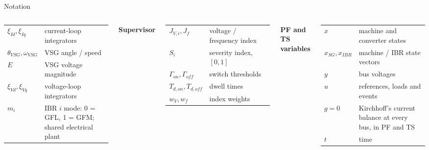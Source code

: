 \documentclass{beamer}
\begin{document}
\begin{frame}{Notation}
\begin{columns}[t,onlytextwidth]
\begin{tabular}{@{}p{1.65cm}>{\raggedright\arraybackslash}p{3.25cm}@{}}
$\xi_{Id},\xi_{Iq}$ & current-loop integrators\\
$\theta_{VSG},\omega_{VSG}$ & VSG angle / speed\\
$E$ & VSG voltage magnitude\\
$\xi_{Vd},\xi_{Vq}$ & voltage-loop integrators\\
$m_i$ & IBR $i$ mode: 0 = GFL, 1 = GFM; shared electrical plant\\
\end{tabular}\par\medskip
\textbf{Supervisor}\par\smallskip
\begin{tabular}{@{}p{1.65cm}>{\raggedright\arraybackslash}p{3.25cm}@{}}
$J_{V,i},J_f$ & voltage / frequency index\\
$S_i$ & severity index, $[0,1]$\\
$\Gamma_{on},\Gamma_{off}$ & switch thresholds\\
$T_{d,on},T_{d,off}$ & dwell times\\
$w_V,w_f$ & index weights\\
\end{tabular}
\par\medskip
\textbf{PF and TS variables}\par\smallskip
\begin{tabular}{@{}p{1.65cm}>{\raggedright\arraybackslash}p{3.25cm}@{}}
$x$ & machine and converter states\\
$x_{SG},x_{IBR}$ & machine / IBR state vectors\\
$y$ & bus voltages\\
$u$ & references, loads and events\\
$g=0$ & Kirchhoff's current balance at every bus, in PF and TS\\
$t$ & time\\
\end{tabular}
\end{columns}
\end{frame}
\end{document}
